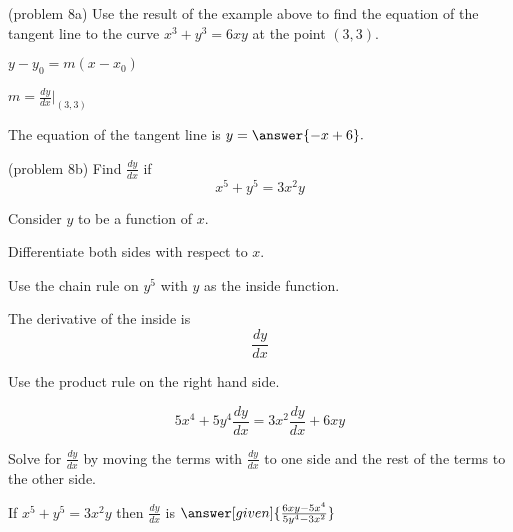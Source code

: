 \documentclass{ximera}
\begin{document}
\begin{center}
\begin{foldable}
\end{foldable}
\end{center}


\begin{problem}(problem 8a)
Use the result of the example above to find the equation of the tangent line to the curve $x^3 + y^3 = 6xy$ at the point $(3,3).$

\begin{hint}
$y-y_0 = m(x-x_0)$
\end{hint}
\begin{hint}
$m = \frac{dy}{dx}\bigg|_{(3,3)}$
\end{hint}
The equation of the tangent line is $y = \answer{-x + 6}.$
\end{problem}




\begin{problem}(problem 8b)
  Find $\frac{dy}{dx}$ if
  \[
  x^5 + y^5 = 3x^2y
  \]
  
	  
    \begin{hint}
      Consider $y$ to be a function of $x$.
    \end{hint}
		\begin{hint}
		  Differentiate both sides with respect to $x$.
		\end{hint}
    \begin{hint}
      Use the chain rule on $y^5$ with $y$ as the inside function.
    \end{hint}
    \begin{hint}
      The derivative of the inside is 
      \[
      \frac{dy}{dx}
      \]
    \end{hint}
		\begin{hint}
      Use the product rule on the right hand side.
    \end{hint}
		\begin{hint}
		  \[
			5x^4 + 5y^4\frac{dy}{dx} = 3x^2\frac{dy}{dx} + 6xy
			\]
		\end{hint}
		\begin{hint}
		  Solve for $\frac{dy}{dx}$ by moving the terms with $\frac{dy}{dx}$ 
			to one side and the 
			rest of the terms to the other side.
		\end{hint}
    
		If $x^5 + y^5 = 3x^2y$ then $\frac{dy}{dx}$ is
		 $\answer[given]{\frac{6xy - 5x^4}{5y^4 - 3x^2}}$
		
\end{problem}
\end{document}
